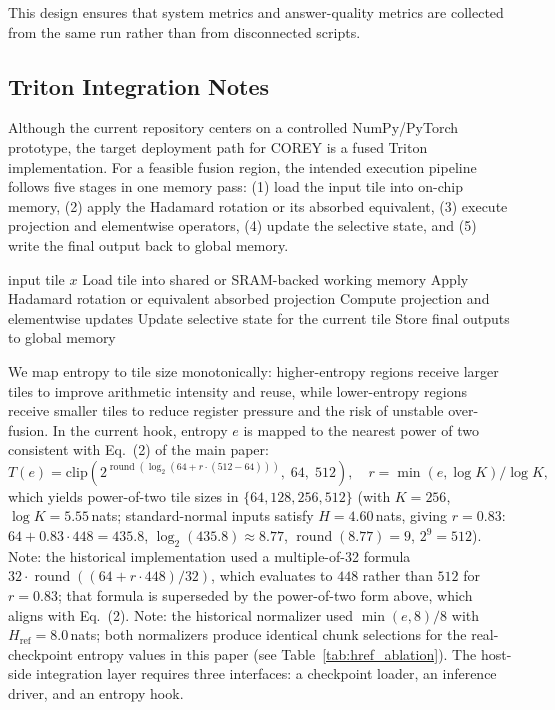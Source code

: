 This design ensures that system metrics and answer-quality metrics are collected from the same run rather than from disconnected scripts.

\subsection{Triton Integration Notes}
Although the current repository centers on a controlled NumPy/PyTorch prototype, the target deployment path for COREY is a fused Triton implementation. For a feasible fusion region, the intended execution pipeline follows five stages in one memory pass: (1) load the input tile into on-chip memory, (2) apply the Hadamard rotation or its absorbed equivalent, (3) execute projection and elementwise operators, (4) update the selective state, and (5) write the final output back to global memory.

\begin{algorithm}[t]
\caption{Triton Fused SSM Kernel (\emph{prospective design target; not implemented or measured in this submission})}
\label{alg:triton_kernel}
\begin{algorithmic}[1]
\Require input tile \(x\)
\State Load tile into shared or SRAM-backed working memory
\State Apply Hadamard rotation or equivalent absorbed projection
\State Compute projection and elementwise updates
\State Update selective state for the current tile
\State Store final outputs to global memory
\end{algorithmic}
\end{algorithm}

We map entropy to tile size monotonically: higher-entropy regions receive larger tiles to improve arithmetic intensity and reuse, while lower-entropy regions receive smaller tiles to reduce register pressure and the risk of unstable over-fusion. In the current hook, entropy \(e\) is mapped to the nearest power of two consistent with Eq.~(2) of the main paper:
\[
T(e) = \mathrm{clip}\!\left(2^{\operatorname{round}(\log_2(64 + r\cdot(512-64)))},\;64,\;512\right), \quad r = \min(e,\log K)/\log K,
\]
which yields power-of-two tile sizes in $\{64, 128, 256, 512\}$ (with $K{=}256$, $\log K{=}5.55$\,nats; standard-normal inputs satisfy $H{=}4.60$\,nats, giving $r{=}0.83$: $64+0.83\cdot448=435.8$, $\log_2(435.8)\approx8.77$, $\operatorname{round}(8.77)=9$, $2^9=512$).
Note: the historical implementation used a multiple-of-32 formula $32\cdot\operatorname{round}((64+r\cdot448)/32)$, which evaluates to $448$ rather than $512$ for $r{=}0.83$; that formula is superseded by the power-of-two form above, which aligns with Eq.~(2).
Note: the historical normalizer used $\min(e,8)/8$ with $H_{\text{ref}}{=}8.0$\,nats; both normalizers produce identical chunk selections for the real-checkpoint entropy values in this paper (see Table~\ref{tab:href_ablation}).
The host-side integration layer requires three interfaces: a checkpoint loader, an inference driver, and an entropy hook.

